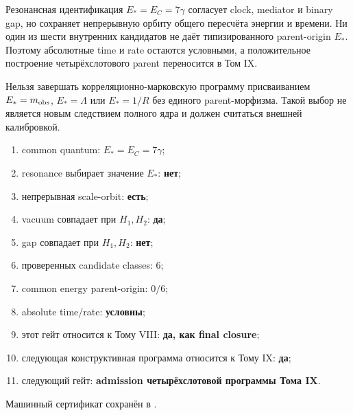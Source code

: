 \begin{theorem}
Резонансная идентификация $E_*=E_C=7\gamma$ согласует clock, mediator и
binary gap, но сохраняет непрерывную орбиту общего пересчёта энергии и
времени. Ни один из шести внутренних кандидатов не даёт типизированного
parent-origin $E_*$. Поэтому абсолютные time и rate остаются условными, а
положительное построение четырёхслотового parent переносится в Том IX.
\end{theorem}

\begin{nogocriterion}
Нельзя завершать корреляционно-марковскую программу присваиванием
$E_*=m_{\rm obs}$, $E_*=\Lambda$ или $E_*=1/R$ без единого parent-морфизма.
Такой выбор не является новым следствием полного ядра и должен считаться
внешней калибровкой.
\end{nogocriterion}

\begin{protocol}\begin{enumerate}
\item common quantum: \textbf{$E_*=E_C=7\gamma$};
\item resonance выбирает значение $E_*$: \textbf{нет};
\item непрерывная scale-orbit: \textbf{есть};
\item vacuum совпадает при $H_1,H_2$: \textbf{да};
\item gap совпадает при $H_1,H_2$: \textbf{нет};
\item проверенных candidate classes: \textbf{$6$};
\item common energy parent-origin: \textbf{$0/6$};
\item absolute time/rate: \textbf{условны};
\item этот гейт относится к Тому VIII: \textbf{да, как final closure};
\item следующая конструктивная программа относится к Тому IX: \textbf{да};
\item следующий гейт: \textbf{admission четырёхслотовой программы Тома IX}.
\end{enumerate}\end{protocol}

Машинный сертификат сохранён в
.